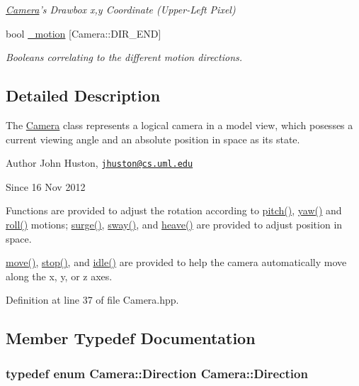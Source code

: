 \begin{DoxyCompactItemize}
\begin{DoxyCompactList}\small\item\em \hyperlink{class_camera}{Camera}'s Drawbox x,y Coordinate (Upper-\/\-Left Pixel) \end{DoxyCompactList}\item 
bool \hyperlink{class_camera_abec7e2becbad5a692a54a69b6a5f6d75}{\-\_\-motion} \mbox{[}Camera\-::\-D\-I\-R\-\_\-\-E\-N\-D\mbox{]}
\begin{DoxyCompactList}\small\item\em Booleans correlating to the different motion directions. \end{DoxyCompactList}\end{DoxyCompactItemize}


\subsection{Detailed Description}
The \hyperlink{class_camera}{Camera} class represents a logical camera in a model view, which posesses a current viewing angle and an absolute position in space as its state. 

\begin{DoxyAuthor}{Author}
John Huston, \href{mailto:jhuston@cs.uml.edu}{\tt jhuston@cs.\-uml.\-edu} 
\end{DoxyAuthor}
\begin{DoxySince}{Since}
16 Nov 2012
\end{DoxySince}
Functions are provided to adjust the rotation according to \hyperlink{class_camera_aac7dbb6201be7f17e014fc6fdf915560}{pitch()}, \hyperlink{class_camera_a0ce7d12edbe47d9a8915d8af98d8f524}{yaw()} and \hyperlink{class_camera_a1ba0979fe0b2ec58085d5f9721858e5e}{roll()} motions; \hyperlink{class_camera_abb2251df65445bf8efd3fe0074fb5033}{surge()}, \hyperlink{class_camera_abbe6fe82ed05e64e35b0c4ed2001b34e}{sway()}, and \hyperlink{class_camera_a2148d751f104d8e39c9832e2372df2d9}{heave()} are provided to adjust position in space.

\hyperlink{class_camera_aaa9706527438bd5bd323dd018bb34fcf}{move()}, \hyperlink{class_camera_ae7414c6ae83c3c9392ab90e957daf2b9}{stop()}, and \hyperlink{class_camera_a9c620bd05c119791c080e479ee71abc2}{idle()} are provided to help the camera automatically move along the x, y, or z axes. 

Definition at line 37 of file Camera.\-hpp.



\subsection{Member Typedef Documentation}
\hypertarget{class_camera_a94bb7ceb1c7a05e54cf638924f228baf}{
\subsubsection[{Direction}]{\setlength{\rightskip}{0pt plus 5cm}typedef enum {\bf Camera\-::\-Direction}  {\bf Camera\-::\-Direction}}}\label{class_camera_a94bb7ceb1c7a05e54cf638924f228baf}



